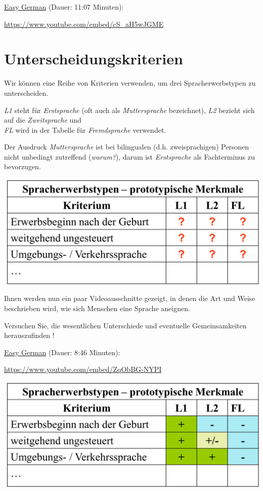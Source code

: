 \documentclass[
  letterpaper,
]{scrbook}
\begin{document}
\href{https://www.youtube.com/watch?v=cS_aH5wJGME}{Easy German} (Dauer:
11:07 Minuten):

\url{https://www.youtube.com/embed/cS_aH5wJGME}

\hypertarget{unterscheidungskriterien}{%
\section{Unterscheidungskriterien}\label{unterscheidungskriterien}}

Wir können eine Reihe von Kriterien verwenden, um drei
Spracherwerbstypen zu unterscheiden.

\emph{L1} steht für \emph{Erstsprache} (oft auch als
\emph{Muttersprache} bezeichnet), \emph{L2} bezieht sich auf die
\emph{Zweitsprache} und\\
\emph{FL} wird in der Tabelle für \emph{Fremdsprache} verwendet.

Der Ausdruck \emph{Muttersprache} ist bei bilingualen (d.h.
zweisprachigen) Personen nicht unbedingt zutreffend (\emph{warum?}),
darum ist \emph{Erstsprache} als Fachterminus zu bevorzugen.

\includegraphics[width=8.62in,height=\textheight]{./pictures/spracherwerbstypen.png}

Ihnen werden nun ein paar Videoausschnitte gezeigt, in denen die Art und
Weise beschrieben wird, wie sich Menschen eine Sprache aneignen.

Versuchen Sie, die wesentlichen Unterschiede und eventuelle
Gemeinsamkeiten herauszufinden !

\href{https://www.youtube.com/watch?v=ZqObBG-NYPI}{Easy German} (Dauer:
8:46 Minuten):

\url{https://www.youtube.com/embed/ZqObBG-NYPI}

\includegraphics[width=8.62in,height=\textheight]{./pictures/spracherwerbstypen2.png}
\end{document}
